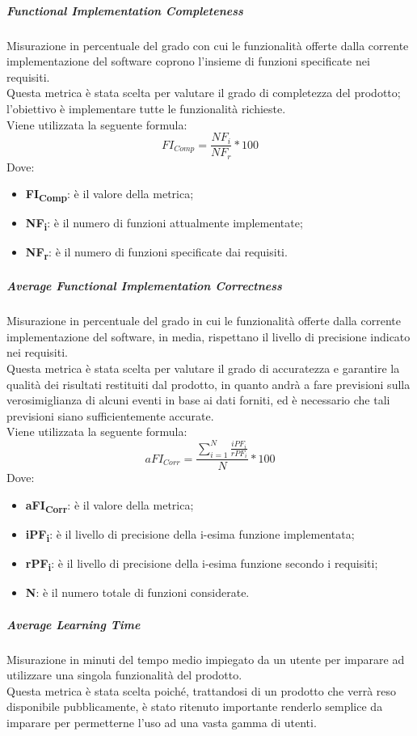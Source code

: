 \subparagraph{Functional Implementation Completeness}\Spazio
Misurazione in percentuale del grado con cui le funzionalità offerte dalla corrente implementazione del software coprono l'insieme di funzioni specificate nei requisiti.\\
Questa metrica è stata scelta per valutare il grado di completezza del prodotto; l'obiettivo è implementare tutte le funzionalità richieste.\\
Viene utilizzata la seguente formula:
$$FI_{Comp}=\frac{NF_i}{NF_r}*100$$
Dove:
\begin{itemize}
	\item{\textbf{FI\textsubscript{Comp}}: è il valore della metrica;}
	\item{\textbf{NF\textsubscript{i}}: è il numero di funzioni attualmente implementate;}
	\item{\textbf{NF\textsubscript{r}}: è il numero di funzioni specificate dai requisiti.}
\end{itemize}
\subparagraph{Average Functional Implementation Correctness}\Spazio
Misurazione in percentuale del grado in cui le funzionalità offerte dalla corrente implementazione del software, in media, rispettano il livello di precisione indicato nei requisiti.\\
Questa metrica è stata scelta per valutare il grado di accuratezza e garantire la qualità dei risultati restituiti dal prodotto, in quanto andrà a fare previsioni sulla verosimiglianza di alcuni eventi in base ai dati forniti, ed è necessario che tali previsioni siano sufficientemente accurate.\\
Viene utilizzata la seguente formula:
$$aFI_{Corr}=\frac{\sum\limits_{i=1}^N\frac{iPF_i}{rPF_i}}{N}*100$$
Dove:
\begin{itemize}
	\item{\textbf{aFI\textsubscript{Corr}}: è il valore della metrica;}
	\item{\textbf{iPF\textsubscript{i}}: è il livello di precisione della i-esima funzione implementata;}
	\item{\textbf{rPF\textsubscript{i}}: è il livello di precisione della i-esima funzione secondo i requisiti;}
	\item{\textbf{N}: è il numero totale di funzioni considerate.}
\end{itemize}
\subparagraph{Average Learning Time}\Spazio
Misurazione in minuti del tempo medio impiegato da un utente per imparare ad utilizzare una singola funzionalità del prodotto.
\\Questa metrica è stata scelta poiché, trattandosi di un prodotto che verrà reso disponibile pubblicamente, è stato ritenuto importante renderlo semplice da imparare per permetterne l'uso ad una vasta gamma di utenti.
